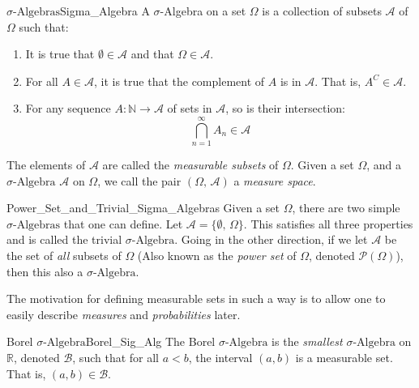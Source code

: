         \begin{ldefinition}{$\sigma\textrm{-Algebras}$}{Sigma_Algebra}
            A $\sigma$-Algebra on a set $\Omega$ is a collection of subsets
            $\mathcal{A}$ of $\Omega$ such that:
            \begin{enumerate}
                \item It is true that $\emptyset\in\mathcal{A}$ and that
                      $\Omega\in\mathcal{A}$.
                \item For all $A\in\mathcal{A}$, it is true that the complement
                      of $A$ is in $\mathcal{A}$. That is,
                      $A^{C}\in\mathcal{A}$.
                \item For any sequence $A:\mathbb{N}\rightarrow\mathcal{A}$ of
                      sets in $\mathcal{A}$, so is their intersection:
                      \begin{equation}
                          \bigcap_{n=1}^{\infty}A_{n}\in\mathcal{A}
                      \end{equation}
            \end{enumerate}
            The elements of $\mathcal{A}$ are called the
            \textit{measurable subsets} of $\Omega$. Given a set $\Omega$, and
            a $\sigma\textrm{-Algebra}$ $\mathcal{A}$ on $\Omega$, we call
            the pair $(\Omega,\,\mathcal{A})$ a \textit{measure space}.
        \end{ldefinition}
        \begin{lexample}{}{Power_Set_and_Trivial_Sigma_Algebras}
            Given a set $\Omega$, there are two simple
            $\sigma\textrm{-Algebras}$ that one can define. Let
            $\mathcal{A}=\{\emptyset,\,\Omega\}$. This satisfies all three
            properties and is called the trivial $\sigma\textrm{-Algebra}$.
            Going in the other direction, if we let $\mathcal{A}$ be the set of
            \textit{all} subsets of $\Omega$ (Also known as the
            \textit{power set} of $\Omega$, denoted $\mathcal{P}(\Omega)$),
            then this also a $\sigma\textrm{-Algebra}$.
        \end{lexample}
        The motivation for defining measurable sets in such a way is to allow
        one to easily describe \textit{measures} and \textit{probabilities}
        later.
        \begin{ldefinition}{Borel $\sigma\textrm{-Algebra}$}{Borel_Sig_Alg}
            The Borel $\sigma\textrm{-Algebra}$ is the \textit{smallest}
            $\sigma\textrm{-Algebra}$ on $\mathbb{R}$, denoted $\mathcal{B}$,
            such that for all $a<b$, the interval $(a,b)$ is a measurable
            set. That is, $(a,b)\in\mathcal{B}$.
        \end{ldefinition}
